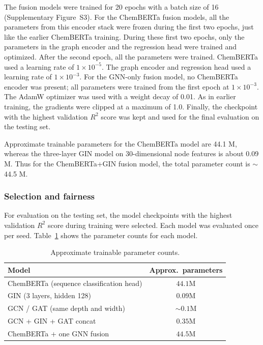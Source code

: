 \documentclass[11pt,a4paper]{article}
\begin{document}
The fusion models were trained for 20 epochs with a batch size of 16 (Supplementary Figure~S3).
For the ChemBERTa fusion models, all the parameters from this encoder stack were frozen during the first two epochs, just like the earlier ChemBERTa training.
During these first two epochs, only the parameters in the graph encoder and the regression head were trained and optimized.
After the second epoch, all the parameters were trained.
ChemBERTa used a learning rate of $1\times 10^{-5}$.
The graph encoder and regression head used a learning rate of $1\times 10^{-3}$.
For the GNN-only fusion model, no ChemBERTa encoder was present; all parameters were trained from the first epoch at $1\times 10^{-3}$.
The AdamW optimizer was used with a weight decay of 0.01.
As in earlier training, the gradients were clipped at a maximum of 1.0.
Finally, the checkpoint with the highest validation $R^{2}$ score was kept and used for the final evaluation on the testing set.

Approximate trainable parameters for the ChemBERTa model are 44.1 M, whereas the three-layer GIN model on 30-dimensional node features is about 0.09 M.
Thus for the ChemBERTa+GIN fusion model, the total parameter count is $\sim$44.5 M.

\subsubsection{Selection and fairness}
For evaluation on the testing set, the model checkpoints with the highest validation $R^{2}$ score during training were selected.
Each model was evaluated once per seed.
Table~\ref{tab:params} shows the parameter counts for each model.

\begin{table}[H]
\centering
\caption{Approximate trainable parameter counts.}
\label{tab:params}
\begin{tabular}{lc}
\toprule
\textbf{Model} & \textbf{Approx.\ parameters} \\
\midrule
ChemBERTa (sequence classification head) & $44.1$M \\
GIN (3 layers, hidden 128) & $0.09$M \\
GCN / GAT (same depth and width) & $\sim 0.1$M \\
GCN + GIN + GAT concat & $0.35$M \\
ChemBERTa + one GNN fusion & $44.5$M \\
\bottomrule
\end{tabular}
\end{table}
\end{document}
